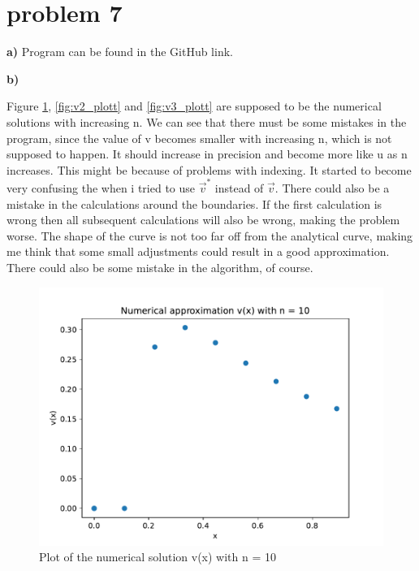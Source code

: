 \documentclass[english,notitlepage]{revtex4-1}
\begin{document}
	
	\section*{problem 7}
	\textbf{a)} Program can be found in the GitHub link.
	
	\textbf{b)} 
	
	Figure \ref{fig:v1_plott}, \ref{fig:v2_plott} and \ref{fig:v3_plott} are supposed to be the numerical solutions with increasing n. We can see that there must be some mistakes in the program, since the value of v becomes smaller with increasing n, which is not supposed to happen. It should increase in precision and become more like u as n increases. This might be because of problems with indexing. It started to become very confusing the when i tried to use $\overrightarrow{v}^*$ instead of $\overrightarrow{v}$. There could also be a mistake in the calculations around the boundaries. If the first calculation is wrong then all subsequent calculations will also be wrong, making the problem worse. The shape of the curve is not too far off from the analytical curve, making me think that some small adjustments could result in a good approximation. There could also be some mistake in the algorithm, of course. 
	
	\begin{figure}[H]
		\centering
		\includegraphics[scale=0.55]{v1_plot.pdf}
		\caption{Plot of the numerical solution v(x) with n = 10}
		\label{fig:v1_plott}
	\end{figure}
\end{document}
